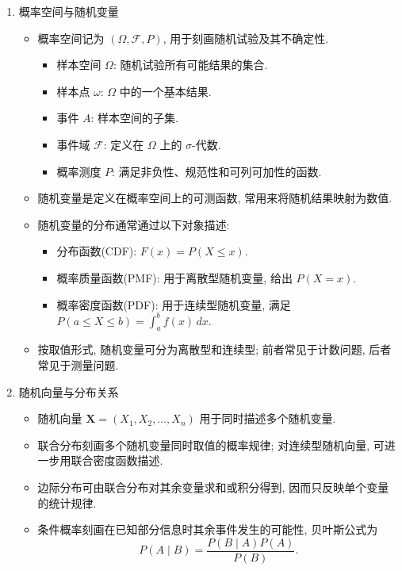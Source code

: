 \documentclass{../nndlcourse}
\begin{document}
\begin{enumerate}
  \item 概率空间与随机变量
    \begin{itemize}
      \item 概率空间记为 $(\Omega, \mathcal{F}, P)$, 用于刻画随机试验及其不确定性.
        \begin{itemize}
          \item 样本空间 $\Omega$: 随机试验所有可能结果的集合.
          \item 样本点 $\omega$: $\Omega$ 中的一个基本结果.
          \item 事件 $A$: 样本空间的子集.
          \item 事件域 $\mathcal{F}$: 定义在 $\Omega$ 上的 $\sigma$-代数.
          \item 概率测度 $P$: 满足非负性、规范性和可列可加性的函数.
        \end{itemize}
      \item 随机变量是定义在概率空间上的可测函数, 常用来将随机结果映射为数值.
      \item 随机变量的分布通常通过以下对象描述:
        \begin{itemize}
          \item 分布函数(CDF): $F(x) = P(X \le x)$.
          \item 概率质量函数(PMF): 用于离散型随机变量, 给出 $P(X = x)$.
          \item 概率密度函数(PDF): 用于连续型随机变量, 满足 $P(a \le X \le b) = \int_a^b f(x) \, dx$.
        \end{itemize}
      \item 按取值形式, 随机变量可分为离散型和连续型; 前者常见于计数问题, 后者常见于测量问题.
    \end{itemize}
  \item 随机向量与分布关系
    \begin{itemize}
      \item 随机向量 $\boldsymbol{X} = (X_1, X_2, \dots, X_n)$ 用于同时描述多个随机变量.
      \item 联合分布刻画多个随机变量同时取值的概率规律; 对连续型随机向量, 可进一步用联合密度函数描述.
      \item 边际分布可由联合分布对其余变量求和或积分得到, 因而只反映单个变量的统计规律.
      \item 条件概率刻画在已知部分信息时其余事件发生的可能性, 贝叶斯公式为
        \begin{equation*}
        P(A \mid B) = \frac{P(B \mid A) P(A)}{P(B)}.
        \end{equation*}

\end{itemize}
\end{enumerate}
\end{document}
